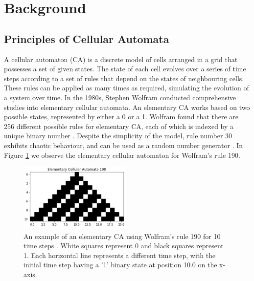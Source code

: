 \newpage
\section{Background}\label{background}
\subsection{Principles of Cellular Automata}\label{CA_Principles}

A cellular automaton (CA) is a discrete model of cells arranged in a grid that possesses a set of given states. The state of each cell evolves over a series of time steps according to a set of rules that depend on the states of neighbouring cells. These rules can be applied as many times as required, simulating the evolution of a system over time. \newline \indent In the 1980s, Stephen Wolfram conducted comprehensive studies into elementary cellular automata. An elementary CA works based on two possible states, represented by either a 0 or a 1. Wolfram found that there are 256 different possible rules for elementary CA, each of which is indexed by a unique binary number \cite{wolfram1986theory}. Despite the simplicity of the model, rule number 30 exhibits chaotic behaviour, and can be used as a random number generator \cite{Wolfram_2002}. In Figure \ref{rule190} we observe the elementary cellular automaton for Wolfram's rule 190.

\begin{figure}[h!]
\centering
\includegraphics[width=0.5\textwidth]{Figures/cell.png}\caption{An example of an elementary CA using Wolfram's rule 190 for 10 time steps \cite{wolfram1986theory}. White squares represent 0 and black squares represent 1. Each horizontal line represents a different time step, with the initial time step having a '1' binary state at position 10.0 on the x-axis.}\label{rule190}
\end{figure} 

